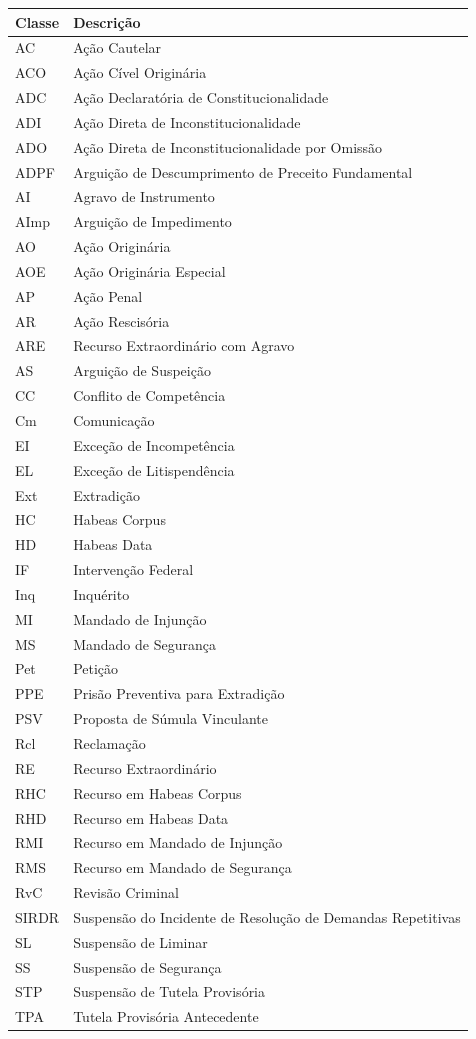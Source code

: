 \documentclass[
]{book}
\theoremstyle{definition}
\theoremstyle{definition}
\theoremstyle{definition}
\theoremstyle{definition}
\theoremstyle{remark}
\begin{document}
\begin{tabular}{l|l}
\hline
Classe & Descrição\\
\hline
AC & Ação Cautelar\\
\hline
ACO & Ação Cível Originária\\
\hline
ADC & Ação Declaratória de Constitucionalidade\\
\hline
ADI & Ação Direta de Inconstitucionalidade\\
\hline
ADO & Ação Direta de Inconstitucionalidade por Omissão\\
\hline
ADPF & Arguição de Descumprimento de Preceito Fundamental\\
\hline
AI & Agravo de Instrumento\\
\hline
AImp & Arguição de Impedimento\\
\hline
AO & Ação Originária\\
\hline
AOE & Ação Originária Especial\\
\hline
AP & Ação Penal\\
\hline
AR & Ação Rescisória\\
\hline
ARE & Recurso Extraordinário com Agravo\\
\hline
AS & Arguição de Suspeição\\
\hline
CC & Conflito de Competência\\
\hline
Cm & Comunicação\\
\hline
EI & Exceção de Incompetência\\
\hline
EL & Exceção de Litispendência\\
\hline
Ext & Extradição\\
\hline
HC & Habeas Corpus\\
\hline
HD & Habeas Data\\
\hline
IF & Intervenção Federal\\
\hline
Inq & Inquérito\\
\hline
MI & Mandado de Injunção\\
\hline
MS & Mandado de Segurança\\
\hline
Pet & Petição\\
\hline
PPE & Prisão Preventiva para Extradição\\
\hline
PSV & Proposta de Súmula Vinculante\\
\hline
Rcl & Reclamação\\
\hline
RE & Recurso Extraordinário\\
\hline
RHC & Recurso em Habeas Corpus\\
\hline
RHD & Recurso em Habeas Data\\
\hline
RMI & Recurso em Mandado de Injunção\\
\hline
RMS & Recurso em Mandado de Segurança\\
\hline
RvC & Revisão Criminal\\
\hline
SIRDR & Suspensão do Incidente de Resolução de Demandas Repetitivas\\
\hline
SL & Suspensão de Liminar\\
\hline
SS & Suspensão de Segurança\\
\hline
STP & Suspensão de Tutela Provisória\\
\hline
TPA & Tutela Provisória Antecedente\\
\hline
\end{tabular}
\end{document}
